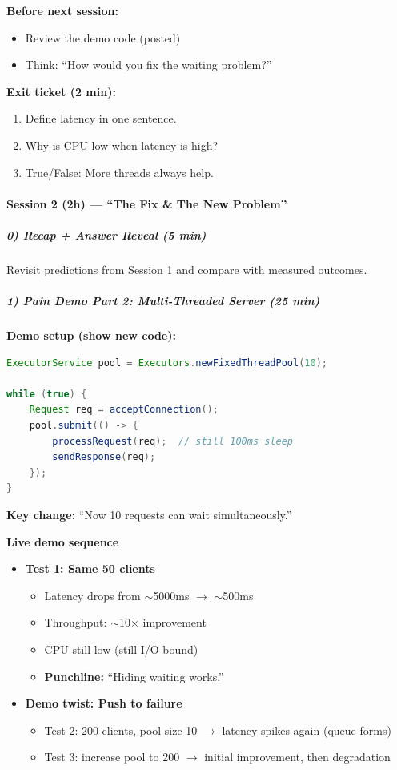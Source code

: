 \documentclass[11pt,a4paper]{article}
\begin{document}
\textbf{Before next session:}
\begin{itemize}[leftmargin=*]
\item Review the demo code (posted)
\item Think: ``How would you fix the waiting problem?''
\end{itemize}

\textbf{Exit ticket (2 min):}
\begin{enumerate}[leftmargin=*]
\item Define latency in one sentence.
\item Why is CPU low when latency is high?
\item True/False: More threads always help.
\end{enumerate}

\paragraph{Session 2 (2h) --- ``The Fix \& The New Problem''}

\subparagraph{0) Recap + Answer Reveal (5 min)}
Revisit predictions from Session 1 and compare with measured outcomes.

\subparagraph{1) Pain Demo Part 2: Multi-Threaded Server (25 min)}

\textbf{Demo setup (show new code):}
\begin{lstlisting}[language=Java]
ExecutorService pool = Executors.newFixedThreadPool(10);

while (true) {
	Request req = acceptConnection();
	pool.submit(() -> {
		processRequest(req);  // still 100ms sleep
		sendResponse(req);
	});
}
\end{lstlisting}

\textbf{Key change:} ``Now 10 requests can wait simultaneously.''

\textbf{Live demo sequence}
\begin{itemize}[leftmargin=*]
\item \textbf{Test 1: Same 50 clients}
\begin{itemize}[leftmargin=*]
	\item Latency drops from $\sim$5000ms $\rightarrow$ $\sim$500ms
	\item Throughput: $\sim$10$\times$ improvement
	\item CPU still low (still I/O-bound)
	\item \textbf{Punchline:} ``Hiding waiting works.''
\end{itemize}
\item \textbf{Demo twist: Push to failure}
\begin{itemize}[leftmargin=*]
	\item Test 2: 200 clients, pool size 10 $\rightarrow$ latency spikes again (queue forms)
	\item Test 3: increase pool to 200 $\rightarrow$ initial improvement, then degradation
\end{itemize}
\end{itemize}
\end{document}
